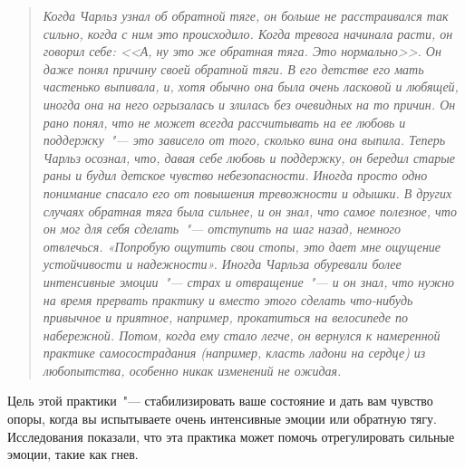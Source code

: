 \begin{quotation}
	\textit{Когда Чарльз узнал об обратной тяге, он больше не расстраивался так сильно, когда с ним это происходило. Когда тревога начинала расти, он говорил себе: <<А, ну это же обратная тяга. Это нормально>>. Он даже понял причину своей обратной тяги. В его детстве его мать частенько выпивала, и, хотя обычно она была очень ласковой и любящей, иногда она на него огрызалась и злилась без очевидных на то причин. Он рано понял, что не может всегда рассчитывать на ее любовь и поддержку~"--- это зависело от того, сколько вина она выпила. Теперь Чарльз осознал, что, давая себе любовь и поддержку, он бередил старые раны и будил детское чувство небезопасности. Иногда просто одно понимание спасало его от повышения тревожности и одышки. В других случаях обратная тяга была сильнее, и он знал, что самое полезное, что он мог для себя сделать~"--- отступить на шаг назад, немного отвлечься. «Попробую ощутить свои стопы, это дает мне ощущение устойчивости и надежности». Иногда Чарльза обуревали более интенсивные эмоции~"--- страх и отвращение~"--- и он знал, что нужно на время прервать практику и вместо этого сделать что-нибудь привычное и приятное, например, прокатиться на велосипеде по набережной. Потом, когда ему стало легче, он вернулся к намеренной практике самосострадания (например, класть ладони на сердце) из любопытства, особенно никак изменений не ожидая.}
\end{quotation}

\newpage
{}\label{IP:Feeling_the_Soles_of_Your_Feet}
Цель этой практики~"--- стабилизировать ваше состояние и дать вам чувство опоры, когда вы испытываете очень интенсивные эмоции или обратную тягу. Исследования показали, что эта практика может помочь отрегулировать сильные эмоции, такие как гнев.

